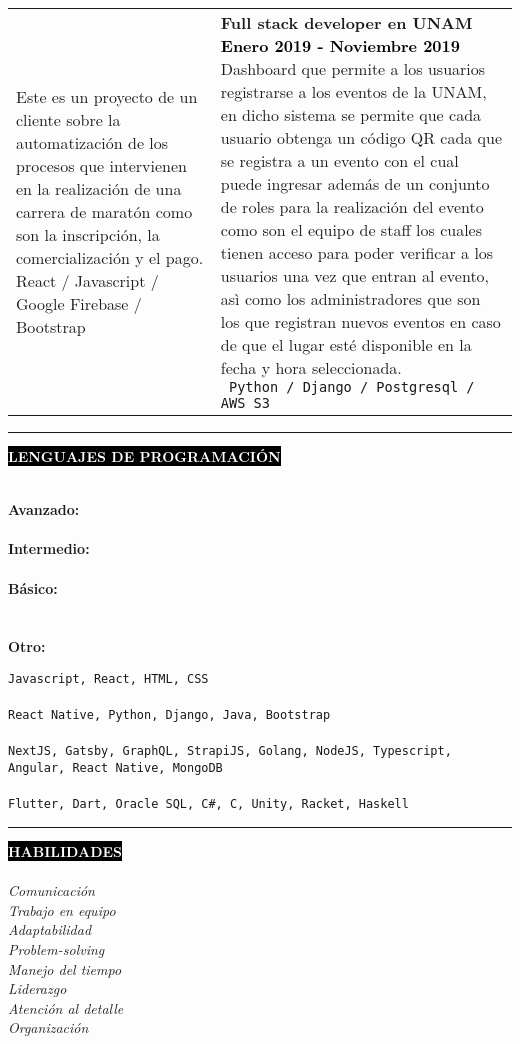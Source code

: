 \documentclass[11pt,A4]{article}
\makeatletter
\newcounter{a}
\newcounter{b}
\newcounter{c}
\newcommand{\cvsection}[1] {
  \textcolor{white}{\MakeUppercase{\textbf{#1}}}
}
\newcommand{\cvsect}[1]{
  \colorbox{black}{{\cvsection{#1}}}\\ \\%
}
\newenvironment{entrylist}{%
  \begin{tabular*}{\textwidth}[t]{@{\extracolsep{\fill}}ll}
  }{%
  \end{tabular*}
}
\newcommand{\entry}[5]{%
  &\parbox[t]{17.5cm}{%
    \large\textbf{#1}%
    \hfill
    {\small \textbf{\textcolor{black}{#2}}}\\%
    \normalsize #4\\
    \texttt{#5}
  }\\\\}
\newcommand{\slashsep}{
  \hspace{1mm}/\hspace{1mm}
}
\makeatother
\begin{document}
\begin{entrylist}
    {Este es un proyecto de un cliente sobre la automatización de los procesos que intervienen en la realización de una carrera de maratón como son la inscripción, la comercialización y el pago.}
    { React \slashsep Javascript \slashsep Google Firebase \slashsep Bootstrap}
	\entry
    {Full stack developer en UNAM}
    {Enero 2019 - Noviembre 2019}
    {PUMA Eventos}
    {Dashboard que permite a los usuarios registrarse a los eventos de la UNAM, en dicho sistema se permite que cada usuario obtenga un código QR cada que se registra a un evento con el cual puede ingresar además de un conjunto de roles para la realización del evento como son el equipo de staff los cuales tienen acceso para poder verificar a los usuarios una vez que entran al evento, asì como los administradores que son los que registran nuevos eventos en caso de que el lugar esté disponible en la fecha y hora seleccionada.}
    { Python	 \slashsep Django \slashsep Postgresql \slashsep AWS S3}
    
  \end{entrylist}
  \begin{minipage}[t]{.8\textwidth}\hrule height 0pt width 0pt%
  \cvsect{Lenguajes de programación}
  \begin{minipage}[t]{0.22\textwidth}
    \textbf{Avanzado: }\\ \\
    \textbf{Intermedio: }\\ \\
    \textbf{Básico: } \\ \\ \\
    \textbf{Otro: }
  \end{minipage}
  \begin{minipage}[t]{.8\textwidth}%
    \texttt{Javascript, React, HTML, CSS} \\ \\
    \texttt{React Native, Python, Django, Java, Bootstrap} \\ \\
    \texttt{NextJS, Gatsby, GraphQL, StrapiJS, Golang, NodeJS, Typescript, Angular, React Native, MongoDB} \\ \\
    \texttt{Flutter, Dart, Oracle SQL, C\#, C, Unity, Racket, Haskell}
  \end{minipage}%
  \end{minipage}
  \hspace{.2cm}
    \begin{minipage}[t]{0.3\textwidth}\hrule height 0pt width 0pt%
    \cvsect{Habilidades}
    \textit{Comunicación}\\
    \textit{Trabajo en equipo}\\
    \textit{Adaptabilidad}\\
    \textit{Problem-solving}\\
    \textit{Manejo del tiempo}\\
    \textit{Liderazgo}\\
    \textit{Atención al detalle}\\
    \textit{Organización}
  \end{minipage} \vspace{0.2cm}
\end{document}
